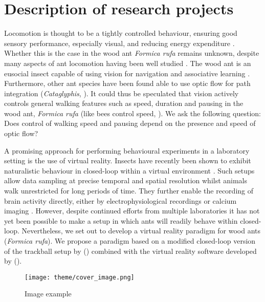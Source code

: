 \chapter{Description of research projects}
\label{chap:rationale}

Locomotion is thought to be a tightly controlled behaviour, ensuring good sensory performance, especially visual, and reducing energy expenditure \autocites{Benichou2011IntermittentStrategies, Kramer2001}. Whether this is the case in the wood ant \textit{Formica rufa} remains unknown, despite many aspects of ant locomotion having been well studied \autocites{Lipp2005, Wahl2015}. The wood ant is an eusocial insect capable of using vision for navigation \autocite{Harris2007} and associative learning \autocite{Fernandes2017a}. Furthermore, other ant species have been found able to use optic flow for path integration (\textit{Cataglyphis}, \citealt{Ronacher1995, Pfeffer2016}). It could thus be speculated that vision actively controls general walking features such as speed, duration and pausing in the wood ant, \textit{Formica rufa} (like bees control speed, \cite{Schone1996, Linander2015}). We ask the following question: Does control of walking speed and pausing depend on the presence and speed of optic flow?

A promising approach for performing behavioural experiments in a laboratory setting is the use of virtual reality. Insects have recently been shown to exhibit naturalistic behaviour in closed-loop within a virtual environment \autocites{Takalo2012, Buatois2017, Seelig2010}. Such setups allow data sampling at precise temporal and spatial resolution whilst animals walk unrestricted for long periods of time. They further enable the recording of brain activity directly, either by electrophysiological recordings or calcium imaging \autocite{Seelig2010}. However, despite continued efforts from multiple laboratories it has not yet been possible to make a setup in which ants will readily behave within closed-loop. Nevertheless, we set out to develop a virtual reality paradigm for wood ants (\textit{Formica rufa}). We propose a paradigm based on a modified closed-loop version of the trackball setup by \citeauthor{Dahmen2017} (\citeyear{Dahmen2017}) combined with the virtual reality software developed by \citeauthor{Aronov2014b} (\citeyear{Aronov2014b}).

\begin{figure}[h]
    \centering
    \texttt{[image: theme/cover\_image.png]}
    \caption{Image example}
    \label{fig:image_example}
\end{figure}